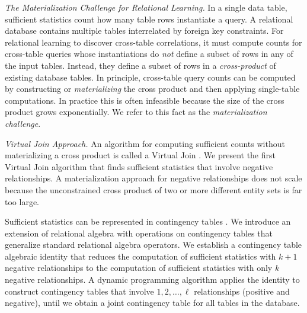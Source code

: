 \documentclass{vldb}
\begin{document}
\emph{The Materialization Challenge for Relational Learning.}  
In a single data table, sufficient statistics count how many table rows instantiate a query. 
A relational database contains multiple tables interrelated by foreign key constraints. For relational learning to discover cross-table correlations, it must compute counts for cross-table queries whose instantiations do {\em not} 
 define a subset of rows in any of the input tables. 
Instead, they define a subset of rows in a {\em cross-product} of existing database tables. 
In principle, cross-table query counts can be computed by constructing or {\em materializing} the cross product and then applying single-table computations. 
In practice this is often infeasible because the size of the cross product grows exponentially. We refer to this fact as the {\em materialization challenge}. 

\emph{Virtual Join Approach.} 
An algorithm for computing sufficient counts without materializing a cross product is called a Virtual Join \cite{Yin2004}. 
We present the first Virtual Join algorithm that finds sufficient statistics that involve negative relationships. 
A materialization approach for negative relationships does not scale because
the unconstrained cross product of two or more different entity sets is far too large.

Sufficient statistics can be represented in contingency tables \cite{Moore1998}. We introduce an extension of relational algebra with operations on contingency tables that generalize standard relational algebra operators. 
We establish a contingency table algebraic identity that reduces the computation of sufficient statistics with $k+1$ negative relationships to the computation of sufficient statistics with only $k$ negative relationships. 
A dynamic programming algorithm applies the identity to construct contingency tables that involve $1,2,\ldots,\ell$ relationships (positive and negative), until we obtain a joint contingency table for all tables in the database. 
\end{document}
